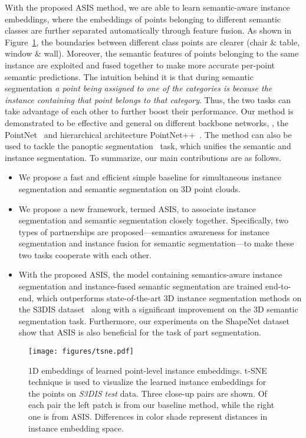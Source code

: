 \documentclass[10pt,twocolumn,letterpaper]{article}
\begin{document}
With the proposed ASIS method, we are able to learn semantic-aware instance embeddings, where the embeddings of points belonging to different semantic classes are further separated automatically through feature fusion.
As shown in Figure~\ref{fig:tsne}, the boundaries between different class points are clearer (chair \& table, window \& wall). 
Moreover, the semantic features of points belonging to the same instance are  exploited 
and fused together to make more accurate per-point semantic predictions. 
The intuition behind it is that during semantic segmentation {\it a point being assigned to one of the categories is because the instance containing that point belongs to that category}.
Thus, the two tasks can take advantage of each other to further boost their performance.
Our method is demonstrated to be effective and general on different backbone networks, \eg, the PointNet~\cite{Qi_2017_CVPR} and hierarchical architecture PointNet++~\cite{qi2017pointnet++}.
The method can also be used to tackle the panoptic segmentation~\cite{kirillov2018panoptic} task, which unifies the semantic and instance segmentation. 
To summarize, our main contributions are as follows.
\begin{itemize}
\setlength{\itemsep}{0pt}
\setlength{\parskip}{0pt}
\setlength{\parsep}{0pt}
  \item We 
  propose a fast and efficient simple baseline for simultaneous instance segmentation and semantic segmentation on 3D point clouds. 
  \item We propose a new framework, termed ASIS, to associate instance segmentation and semantic segmentation closely together. Specifically, two types of partnerships are proposed---semantics  awareness for instance segmentation and instance fusion for semantic segmentation---to make these two tasks cooperate with each other.
  \item With the proposed ASIS, the model containing semantics-aware instance segmentation and instance-fused semantic segmentation are trained end-to-end, which outperforms  state-of-the-art 3D instance segmentation methods on the S3DIS dataset~\cite{s3dis} along with a significant improvement on the 3D semantic segmentation task. 
  Furthermore, our experiments on the ShapeNet dataset~\cite{shapenet} show that ASIS is also beneficial for the task of part segmentation.
\end{itemize}


\begin{figure}[!tb]
\texttt{[image: figures/tsne.pdf]}
\caption{1D embeddings of learned point-level instance embeddings. t-SNE~\cite{maaten2008visualizing} technique is used to visualize the learned instance embeddings for the points on {\em S3DIS test} data. Three close-up  pairs are shown. Of each pair the left patch is from our baseline method, while the right one is from ASIS. Differences in color shade represent distances in instance embedding space.}
\label{fig:tsne}
\end{figure}
\end{document}
